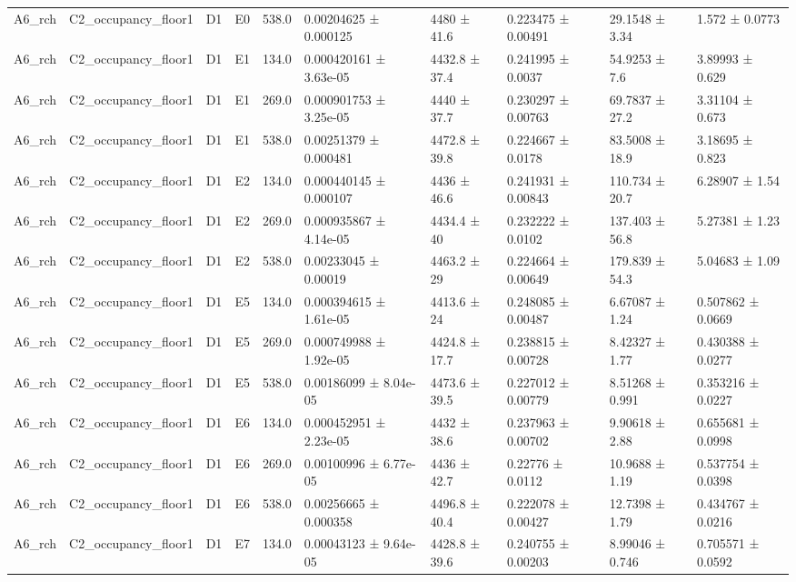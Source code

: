 \begin{table}
\begin{tabular}{llllllllll}
A6\_rch & C2\_occupancy\_floor1 & D1 & E0 & 538.0 & 0.00204625 ± 0.000125 & 4480 ± 41.6 & 0.223475 ± 0.00491 & 29.1548 ± 3.34 & 1.572 ± 0.0773 \\
A6\_rch & C2\_occupancy\_floor1 & D1 & E1 & 134.0 & 0.000420161 ± 3.63e-05 & 4432.8 ± 37.4 & 0.241995 ± 0.0037 & 54.9253 ± 7.6 & 3.89993 ± 0.629 \\
A6\_rch & C2\_occupancy\_floor1 & D1 & E1 & 269.0 & 0.000901753 ± 3.25e-05 & 4440 ± 37.7 & 0.230297 ± 0.00763 & 69.7837 ± 27.2 & 3.31104 ± 0.673 \\
A6\_rch & C2\_occupancy\_floor1 & D1 & E1 & 538.0 & 0.00251379 ± 0.000481 & 4472.8 ± 39.8 & 0.224667 ± 0.0178 & 83.5008 ± 18.9 & 3.18695 ± 0.823 \\
A6\_rch & C2\_occupancy\_floor1 & D1 & E2 & 134.0 & 0.000440145 ± 0.000107 & 4436 ± 46.6 & 0.241931 ± 0.00843 & 110.734 ± 20.7 & 6.28907 ± 1.54 \\
A6\_rch & C2\_occupancy\_floor1 & D1 & E2 & 269.0 & 0.000935867 ± 4.14e-05 & 4434.4 ± 40 & 0.232222 ± 0.0102 & 137.403 ± 56.8 & 5.27381 ± 1.23 \\
A6\_rch & C2\_occupancy\_floor1 & D1 & E2 & 538.0 & 0.00233045 ± 0.00019 & 4463.2 ± 29 & 0.224664 ± 0.00649 & 179.839 ± 54.3 & 5.04683 ± 1.09 \\
A6\_rch & C2\_occupancy\_floor1 & D1 & E5 & 134.0 & 0.000394615 ± 1.61e-05 & 4413.6 ± 24 & 0.248085 ± 0.00487 & 6.67087 ± 1.24 & 0.507862 ± 0.0669 \\
A6\_rch & C2\_occupancy\_floor1 & D1 & E5 & 269.0 & 0.000749988 ± 1.92e-05 & 4424.8 ± 17.7 & 0.238815 ± 0.00728 & 8.42327 ± 1.77 & 0.430388 ± 0.0277 \\
A6\_rch & C2\_occupancy\_floor1 & D1 & E5 & 538.0 & 0.00186099 ± 8.04e-05 & 4473.6 ± 39.5 & 0.227012 ± 0.00779 & 8.51268 ± 0.991 & 0.353216 ± 0.0227 \\
A6\_rch & C2\_occupancy\_floor1 & D1 & E6 & 134.0 & 0.000452951 ± 2.23e-05 & 4432 ± 38.6 & 0.237963 ± 0.00702 & 9.90618 ± 2.88 & 0.655681 ± 0.0998 \\
A6\_rch & C2\_occupancy\_floor1 & D1 & E6 & 269.0 & 0.00100996 ± 6.77e-05 & 4436 ± 42.7 & 0.22776 ± 0.0112 & 10.9688 ± 1.19 & 0.537754 ± 0.0398 \\
A6\_rch & C2\_occupancy\_floor1 & D1 & E6 & 538.0 & 0.00256665 ± 0.000358 & 4496.8 ± 40.4 & 0.222078 ± 0.00427 & 12.7398 ± 1.79 & 0.434767 ± 0.0216 \\
A6\_rch & C2\_occupancy\_floor1 & D1 & E7 & 134.0 & 0.00043123 ± 9.64e-05 & 4428.8 ± 39.6 & 0.240755 ± 0.00203 & 8.99046 ± 0.746 & 0.705571 ± 0.0592 \\

\end{tabular}
\end{table}
